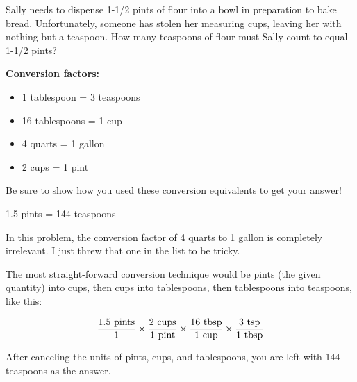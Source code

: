 

Sally needs to dispense 1-1/2 pints of flour into a bowl in preparation to bake bread.  Unfortunately, someone has stolen her measuring cups, leaving her with nothing but a teaspoon.  How many teaspoons of flour must Sally count to equal 1-1/2 pints?

\vskip 10pt

\noindent
{\bf Conversion factors:}

\begin{itemize}
\item{} 1 tablespoon = 3 teaspoons
\item{} 16 tablespoons = 1 cup
\item{} 4 quarts = 1 gallon
\item{} 2 cups = 1 pint
\end{itemize}

Be sure to show how you used these conversion equivalents to get your answer!







1.5 pints = 144 teaspoons

\vskip 10pt

In this problem, the conversion factor of 4 quarts to 1 gallon is completely irrelevant.  I just threw that one in the list to be tricky.

The most straight-forward conversion technique would be pints (the given quantity) into cups, then cups into tablespoons, then tablespoons into teaspoons, like this:

$${{1.5 \hbox{ pints}} \over {1}} \times {{2 \hbox{ cups}} \over {1 \hbox{ pint}}} \times {{16 \hbox{ tbsp}} \over {1 \hbox{ cup}}} \times {{3 \hbox{ tsp}} \over {1 \hbox{ tbsp}}}$$

After canceling the units of pints, cups, and tablespoons, you are left with 144 teaspoons as the answer.












